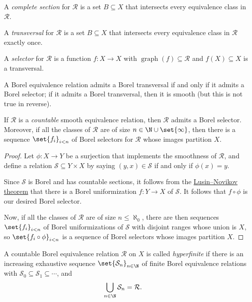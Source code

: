 \documentclass[10pt]{mypackage}
\begin{document}
\begin{definition}
  A \textit{complete section} for $\mathcal{R}$ is a set $B\subseteq X$ that intersects every equivalence class in $\mathcal{R}$.

  A \textit{transversal} for $\mathcal{R}$ is a set $B\subseteq X$ that intersects every equivalence class in $\mathcal{R}$ exactly once.

  A \textit{selector} for $\mathcal{R}$ is a function $f\colon X\rightarrow X$ with $\operatorname{graph}\left( f \right)\subseteq \mathcal{R}$ and $f(X)\subseteq X$ is a transversal.
\end{definition}
A Borel equivalence relation admits a Borel transversal if and only if it admits a Borel selector; if it admits a Borel transversal, then it is smooth (but this is not true in reverse).
\begin{proposition}
  If $\mathcal{R}$ is a \textit{countable} smooth equivalence relation, then $\mathcal{R}$ admits a Borel selector. Moreover, if all the classes of $\mathcal{R}$ are of size $n\in \N\cup\set{\infty}$, then there is a sequence $\set{f_i}_{i < n}$ of Borel selectors for $\mathcal{R}$ whose images partition $X$.
\end{proposition}
\begin{proof}
  Let $\phi\colon X\rightarrow Y$ be a surjection that implements the smoothness of $\mathcal{R}$, and define a relation $\mathcal{S}\subseteq Y\times X$ by saying $\left( y,x \right)\in \mathcal{S}$ if and only if $\phi(x)=y$.

  Since $\mathcal{S}$ is Borel and has countable sections, it follows from the \href{https://en.wikipedia.org/wiki/Countable_Borel_relation#The_Luzin\%E2\%80\%93Novikov_theorem}{Lusin--Novikov theorem} that there is a Borel uniformization $f\colon Y\rightarrow X$ of $\mathcal{S}$. It follows that $f\circ\phi$ is our desired Borel selector.

  Now, if all the classes of $\mathcal{R}$ are of size $n\leq \aleph_0$, there are then sequences $\set{f_i}_{i < n}$ of Borel uniformizations of $\mathcal{S}$ with disjoint ranges whose union is $X$, so $\set{f_i\circ\phi}_{i < n}$ is a sequence of Borel selectors whose images partition $X$.
\end{proof}
\begin{definition}
  A countable Borel equivalence relation $\mathcal{R}$ on $X$ is called \textit{hyperfinite} if there is an increasing exhaustive sequence $\set{\mathcal{S}_n}_{n\in \N}$ of finite Borel equivalence relations with $\mathcal{S}_0\subseteq \mathcal{S}_1\subseteq\cdots$, and
  \begin{align*}
    \bigcup_{n\in \N}\mathcal{S}_n &= \mathcal{R}.
  \end{align*}
\end{definition}
\end{document}
